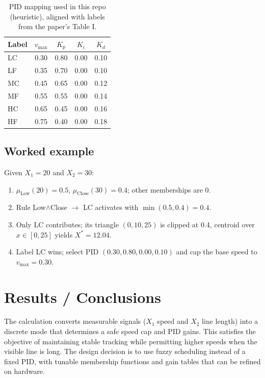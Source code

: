 \documentclass{article}
\begin{document}
\begin{table}[h]
\centering
\begin{tabular}{lcccc}
\toprule
Label & $v_{\max}$ & $K_p$ & $K_i$ & $K_d$\\
\midrule
LC & 0.30 & 0.80 & 0.00 & 0.10\\
LF & 0.35 & 0.70 & 0.00 & 0.10\\
MC & 0.45 & 0.65 & 0.00 & 0.12\\
MF & 0.55 & 0.55 & 0.00 & 0.14\\
HC & 0.65 & 0.45 & 0.00 & 0.16\\
HF & 0.75 & 0.40 & 0.00 & 0.18\\
\bottomrule
\end{tabular}
\caption{PID mapping used in this repo (heuristic), aligned with labels from the paper's Table I.}
\label{tab:pidmap}
\end{table}

\subsection*{Worked example}
Given $X_1=20$ and $X_2=30$:
\begin{enumerate}
\item $\mu_{\text{Low}}(20)=0.5$, $\mu_{\text{Close}}(30)=0.4$; other memberships are 0.
\item Rule Low$\land$Close $\rightarrow$ LC activates with $\min(0.5,0.4)=0.4$.
\item Only LC contributes; its triangle $(0,10,25)$ is clipped at 0.4, centroid over $x\in[0,25]$ yields $X^*=12.04$.
\item Label LC wins; select PID $(0.30, 0.80, 0.00, 0.10)$ and cap the base speed to $v_{\max}=0.30$.
\end{enumerate}

\section{Results / Conclusions}
The calculation converts measurable signals ($X_1$ speed and $X_2$ line length) into a discrete mode that determines a safe speed cap and PID gains. This satisfies the objective of maintaining stable tracking while permitting higher speeds when the visible line is long. The design decision is to use fuzzy scheduling instead of a fixed PID, with tunable membership functions and gain tables that can be refined on hardware.
\end{document}
